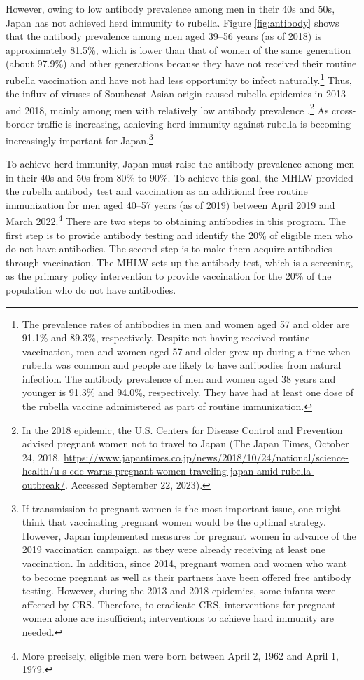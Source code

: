 \documentclass[
      12pt,
    a4paper
]{article}
\begin{document}
However, owing to low antibody prevalence among men in their 40s and 50s, Japan has not achieved herd immunity to rubella. Figure \ref{fig:antibody} shows that the antibody prevalence among men aged 39--56 years (as of 2018) is approximately 81.5\%, which is lower than that of women of the same generation (about 97.9\%) and other generations because they have not received their routine rubella vaccination and have not had less opportunity to infect naturally.\footnote{The prevalence rates of antibodies in men and women aged 57 and older are 91.1\% and 89.3\%, respectively. Despite not having received routine vaccination, men and women aged 57 and older grew up during a time when rubella was common and people are likely to have antibodies from natural infection. The antibody prevalence of men and women aged 38 years and younger is 91.3\% and 94.0\%, respectively. They have had at least one dose of the rubella vaccine administered as part of routine immunization.} Thus, the influx of viruses of Southeast Asian origin caused rubella epidemics in 2013 and 2018, mainly among men with relatively low antibody prevalence \citep{NIID2019}.\footnote{In the 2018 epidemic, the U.S. Centers for Disease Control and Prevention advised pregnant women not to travel to Japan (The Japan Times, October 24, 2018. \url{https://www.japantimes.co.jp/news/2018/10/24/national/science-health/u-s-cdc-warns-pregnant-women-traveling-japan-amid-rubella-outbreak/}. Accessed September 22, 2023).} As cross-border traffic is increasing, achieving herd immunity against rubella is becoming increasingly important for Japan.\footnote{If transmission to pregnant women is the most important issue, one might think that vaccinating pregnant women would be the optimal strategy. However, Japan implemented measures for pregnant women in advance of the 2019 vaccination campaign, as they were already receiving at least one vaccination. In addition, since 2014, pregnant women and women who want to become pregnant as well as their partners have been offered free antibody testing. However, during the 2013 and 2018 epidemics, some infants were affected by CRS. Therefore, to eradicate CRS, interventions for pregnant women alone are insufficient; interventions to achieve hard immunity are needed.}

To achieve herd immunity, Japan must raise the antibody prevalence among men in their 40s and 50s from 80\% to 90\%. To achieve this goal, the MHLW provided the rubella antibody test and vaccination as an additional free routine immunization for men aged 40--57 years (as of 2019) between April 2019 and March 2022.\footnote{More precisely, eligible men were born between April 2, 1962 and April 1, 1979.} There are two steps to obtaining antibodies in this program. The first step is to provide antibody testing and identify the 20\% of eligible men who do not have antibodies. The second step is to make them acquire antibodies through vaccination. The MHLW sets up the antibody test, which is a screening, as the primary policy intervention to provide vaccination for the 20\% of the population who do not have antibodies.
\end{document}
